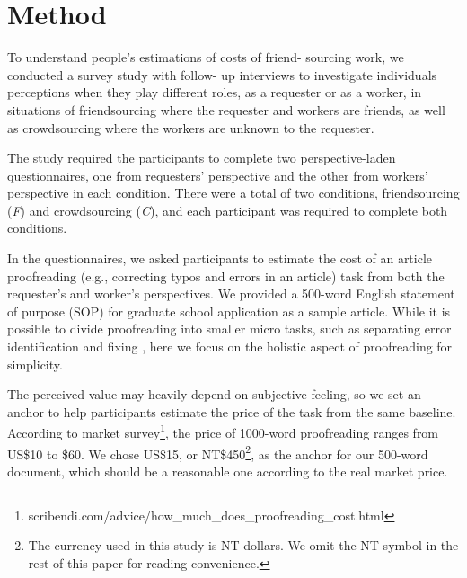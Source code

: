 \section{Method}


To understand people's estimations of costs of friend- sourcing work, 
we conducted a survey study with follow- up interviews to investigate individuals perceptions when they play different roles, 
as a requester or as a worker, 
in situations of friendsourcing where the requester and workers are friends, 
as well as crowdsourcing where the workers are unknown to the requester.

The study required the participants to complete two perspective-laden questionnaires, 
one from requesters' perspective and the other from workers’ perspective in each condition. 
There were a total of two conditions,
friendsourcing (\emph{F}) and crowdsourcing (\emph{C}), and each participant was required to complete both conditions.

In the questionnaires, we asked participants to estimate the cost of an article proofreading 
(e.g., correcting typos and errors in an article) task from both the requester's and worker's perspectives. 
We provided a 500-word English statement of purpose (SOP) for graduate school application as a sample article. 
While it is possible to divide proofreading into smaller micro tasks, 
such as separating error identification and fixing \cite{Bernstein:UIST10:Soylent}, 
here we focus on the holistic aspect of proofreading for simplicity. 

The perceived value may heavily depend on subjective feeling,
so we set an anchor to help participants estimate the price of the task from the same baseline. 
According to market survey\footnote{scribendi.com/advice/how\_much\_does\_proofreading\_cost.html}, 
the price of 1000-word proofreading ranges from US\$10 to \$60. 
We chose US\$15, or NT\$450\footnote{The currency used in this study is NT dollars.
We omit the NT symbol in the rest of this paper for reading convenience.
},
 as the anchor for our 500-word document, which should be a reasonable one according to the real market price.

